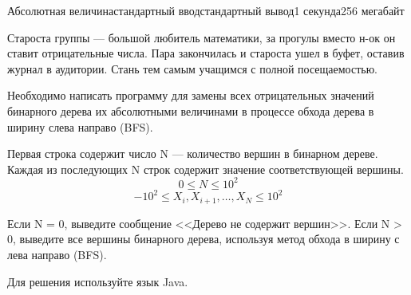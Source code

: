 \begin{problem}{Абсолютная величина}{стандартный ввод}{стандартный вывод}{1 секунда}{256 мегабайт}

Староста группы --- большой любитель математики, за прогулы вместо н-ок он ставит отрицательные числа. Пара закончилась и староста ушел в буфет, оставив журнал в аудитории. Стань тем самым учащимся с полной посещаемостью. 

Необходимо написать программу для замены всех отрицательных значений бинарного дерева их абсолютными величинами в процессе обхода дерева в ширину слева направо (BFS).

\InputFile
Первая строка содержит число N --- количество вершин в бинарном дереве. Каждая из последующих N строк содержит значение соответствующей вершины.
\vspace{1em}
$$0\le N\le 10^2$$
$$-10^{2}\le X_i, X_{i+1}, \ldots, X_N\le 10^2$$

\OutputFile
Если N = 0, выведите сообщение <<Дерево не содержит вершин>>.
Если N > 0, выведите все вершины бинарного дерева, используя метод обхода в ширину с лева направо (BFS).

\Examples

\begin{example}
%
%
%
\end{example}

\Note
Для решения используйте язык Java.

\end{problem}

